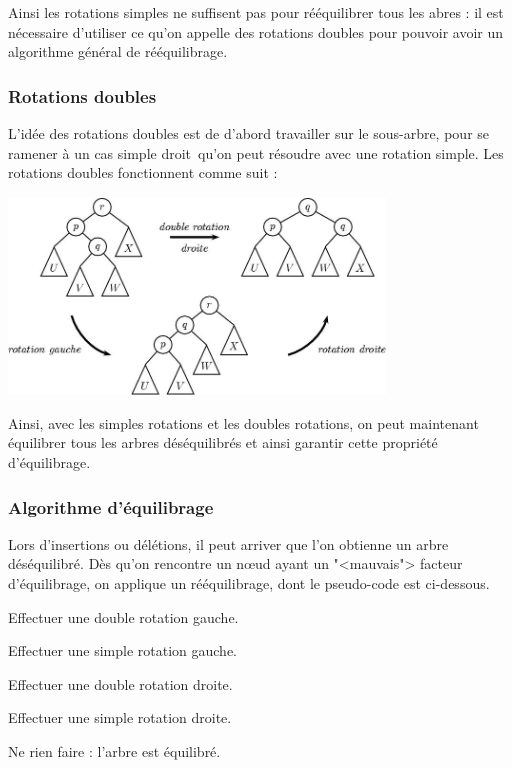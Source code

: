 \documentclass{article}
\begin{document}
Ainsi les rotations simples ne suffisent pas pour rééquilibrer tous les abres : il est nécessaire d'utiliser ce qu'on appelle des rotations doubles pour pouvoir avoir un algorithme général de rééquilibrage.

\subsubsection{Rotations doubles}
L'idée des rotations doubles est de d'abord travailler sur le sous-arbre, pour se ramener à un cas simple \guillemotleft droit\guillemotright\ qu'on peut résoudre avec une rotation simple. Les rotations doubles fonctionnent comme suit \cite{Arbres} :

\includegraphics[width = 10cm]{poly095.jpg}

Ainsi, avec les simples rotations et les doubles rotations, on peut maintenant équilibrer tous les arbres déséquilibrés et ainsi garantir cette propriété d'équilibrage.

\subsubsection{Algorithme d'équilibrage}
Lors d'insertions ou délétions, il peut arriver que l'on obtienne un arbre déséquilibré. Dès qu'on rencontre un n\oe ud ayant un "<mauvais"> facteur d'équilibrage,
on applique un rééquilibrage, dont le pseudo-code est ci-dessous.

\begin{algorithmic}


Effectuer une double rotation gauche.
\Else

Effectuer une simple rotation gauche.

\EndIf
{}


Effectuer une double rotation droite.
\Else

Effectuer une simple rotation droite.
\EndIf
\Else

Ne rien faire : l'arbre est équilibré.
\EndIf
\end{algorithmic}
\end{document}
